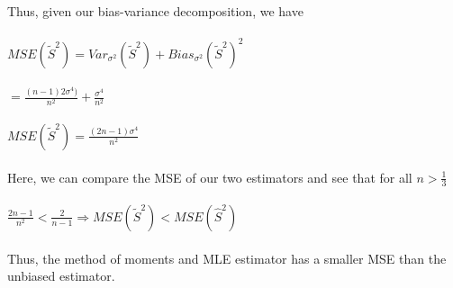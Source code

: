 \documentclass{article}
\begin{document}
Thus, given our bias-variance decomposition, we have\\\\
$MSE(\tilde{S}^2)=Var_{\sigma^2}(\tilde{S}^2)+Bias_{\sigma^2}(\tilde{S}^2)^2$\\\\
$=\frac{(n-1)2\sigma^4)}{n^2}+\frac{\sigma^4}{n^2}$\\\\
$MSE(\tilde{S}^2)=\frac{(2n-1)\sigma^4}{n^2}$\\\\
Here, we can compare the MSE of our two estimators and see that for all $n>\frac{1}{3}$\\\\
$\frac{2n-1}{n^2}<\frac{2}{n-1}\Rightarrow MSE(\tilde{S}^2)<MSE(\hat{S}^2)$\\\\
Thus, the method of moments and MLE estimator has a smaller MSE than the unbiased estimator.
\pagebreak
\end{document}
